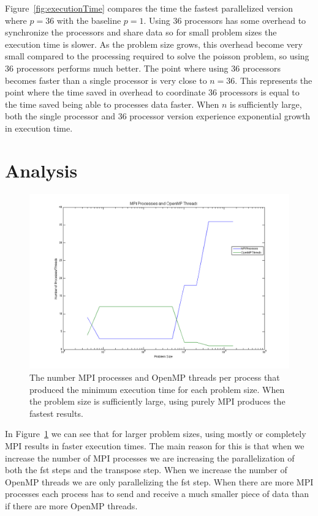 \documentclass{article}
\begin{document}
	Figure~\ref{fig:executionTime} compares the time the fastest parallelized version where $p=36$ with the baseline $p=1$. Using 36 processors has some overhead to synchronize the processors and share data so for small problem sizes the execution time is slower. As the problem size grows, this overhead become very small compared to the processing required to solve the poisson problem, so using 36 processors performs much better. The point where using 36 processors becomes faster than a single processor is very close to $n=36$. This represents the point where the time saved in overhead to coordinate 36 processors is equal to the time saved being able to processes data faster. When $n$ is sufficiently large, both the single processor and 36 processor version experience exponential growth in execution time.  
	

\section{Analysis}

	\begin{figure}[htbp]
	\begin{center}
	\includegraphics[width=15cm,keepaspectratio=true]{figs/threadsProcesses}
	\caption{The number MPI processes and OpenMP threads per process that produced the minimum execution time for each problem size. When the problem size is sufficiently large, using purely MPI produces the fastest results.}
	\label{fig:threadsProcesses}
	\end{center}
	\end{figure}

	In Figure~\ref{fig:threadsProcesses} we can see that for larger problem sizes, using mostly or completely MPI results in faster execution times. The main reason for this is that when we increase the number of MPI processes we are increasing the parallelization of both the fst steps and the transpose step. When we increase the number of OpenMP threads we are only parallelizing the fst step. When there are more MPI processes each process has to send and receive a much smaller piece of data than if there are more OpenMP threads. 
\end{document}

